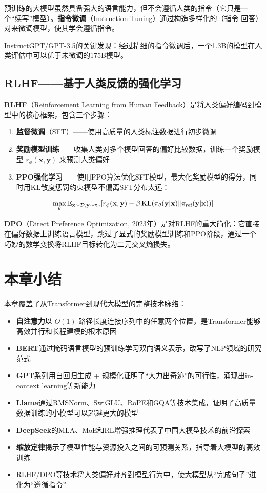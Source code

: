 预训练的大模型虽然具备强大的语言能力，但不会遵循人类的指令（它只是一个``续写''模型）。\textbf{指令微调}（Instruction Tuning）通过构造多样化的（指令-回答）对来微调模型，使其学会遵循指令。

InstructGPT/GPT-3.5的关键发现：经过精细的指令微调后，一个1.3B的模型在人类评估中可以优于未微调的175B模型。

\subsection{RLHF——基于人类反馈的强化学习}

\textbf{RLHF}（Reinforcement Learning from Human Feedback）是将人类偏好编码到模型中的核心框架，包含三个步骤：

\begin{enumerate}
    \item \textbf{监督微调}（SFT）——使用高质量的人类标注数据进行初步微调
    \item \textbf{奖励模型训练}——收集人类对多个模型回答的偏好比较数据，训练一个奖励模型 $r_{\phi}(\mathbf{x}, \mathbf{y})$ 来预测人类偏好
    \item \textbf{PPO强化学习}——使用PPO算法优化SFT模型，最大化奖励模型的得分，同时用KL散度惩罚约束模型不偏离SFT分布太远：
\end{enumerate}

\[
\max_{\theta} \mathbb{E}_{\mathbf{x}\sim\mathcal{D},\mathbf{y}\sim\pi_{\theta}}\!\left[r_{\phi}(\mathbf{x}, \mathbf{y}) - \beta\,\text{KL}(\pi_{\theta}(\mathbf{y}|\mathbf{x}) \| \pi_{\text{ref}}(\mathbf{y}|\mathbf{x}))\right]
\]

\textbf{DPO}（Direct Preference Optimization, 2023年）是对RLHF的重大简化：它直接在偏好数据上训练语言模型，跳过了显式的奖励模型训练和PPO阶段，通过一个巧妙的数学变换将RLHF目标转化为二元交叉熵损失。

\section{本章小结}

本章覆盖了从Transformer到现代大模型的完整技术脉络：
\begin{itemize}
    \item \textbf{自注意力}以 $O(1)$ 路径长度连接序列中的任意两个位置，是Transformer能够高效并行和长程建模的根本原因
    \item \textbf{BERT}通过掩码语言模型的预训练学习双向语义表示，改写了NLP领域的研究范式
    \item \textbf{GPT}系列用自回归生成 + 规模化证明了``大力出奇迹''的可行性，涌现出in-context learning等新能力
    \item \textbf{Llama}通过RMSNorm、SwiGLU、RoPE和GQA等技术集成，证明了高质量数据训练的小模型可以超越更大的模型
    \item \textbf{DeepSeek}的MLA、MoE和RL增强推理代表了中国大模型技术的前沿探索
    \item \textbf{缩放定律}揭示了模型性能与资源投入之间的可预测关系，指导着大模型的高效训练
    \item RLHF/DPO等技术将人类偏好对齐到模型行为中，使大模型从``完成句子''进化为``遵循指令''
\end{itemize}
